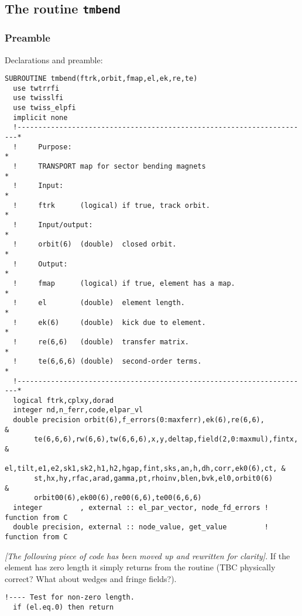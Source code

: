 \documentclass{cern-art} %
\renewcommand{\L}[1]{\lstinline[firstnumber=last]{#1}}
\begin{document}
\subsection{The routine \L{tmbend}}
\subsubsection{Preamble}
Declarations and preamble:
\begin{lstlisting}[firstnumber=auto]
SUBROUTINE tmbend(ftrk,orbit,fmap,el,ek,re,te)
  use twtrrfi
  use twisslfi
  use twiss_elpfi
  implicit none
  !----------------------------------------------------------------------*
  !     Purpose:                                                         *
  !     TRANSPORT map for sector bending magnets                         *
  !     Input:                                                           *
  !     ftrk      (logical) if true, track orbit.                        *
  !     Input/output:                                                    *
  !     orbit(6)  (double)  closed orbit.                                *
  !     Output:                                                          *
  !     fmap      (logical) if true, element has a map.                  *
  !     el        (double)  element length.                              *
  !     ek(6)     (double)  kick due to element.                         *
  !     re(6,6)   (double)  transfer matrix.                             *
  !     te(6,6,6) (double)  second-order terms.                          *
  !----------------------------------------------------------------------*
  logical ftrk,cplxy,dorad
  integer nd,n_ferr,code,elpar_vl
  double precision orbit(6),f_errors(0:maxferr),ek(6),re(6,6),           &
       te(6,6,6),rw(6,6),tw(6,6,6),x,y,deltap,field(2,0:maxmul),fintx,   &
       el,tilt,e1,e2,sk1,sk2,h1,h2,hgap,fint,sks,an,h,dh,corr,ek0(6),ct, &
       st,hx,hy,rfac,arad,gamma,pt,rhoinv,blen,bvk,el0,orbit0(6)         &
       orbit00(6),ek00(6),re00(6,6),te00(6,6,6)
  integer         , external :: el_par_vector, node_fd_errors ! function from C
  double precision, external :: node_value, get_value         ! function from C
\end{lstlisting}
{\em [The following piece of code has been moved up and rewritten for clarity]}. If the element has zero length it simply returns from the routine (TBC physically correct? What about wedges and fringe fields?).
\begin{lstlisting}[firstnumber=last]
  !---- Test for non-zero length.
  if (el.eq.0) then return
\end{lstlisting}
\end{document}
